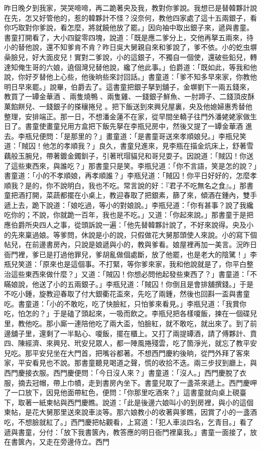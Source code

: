 昨日晚夕到我家，哭哭啼啼，再二跪著央及我，教對你爹說。我想已是替韓夥計說在先，怎又好管他的，惹的韓夥計不怪？沒奈何，教他四家處了這十五兩銀子，看你巧取對你爹說，看怎麼，將就饒他放了罷。」因向袖中取出銀子來，遞與書童。書童打開看了，大小四錠零四塊，說道：「既是應二爹分上，交他再拏五兩來，待小的替他說，還不知爹肯不肯？昨日吳大舅親自來和爹說了，爹不依。小的虼虫塀喿臉兒，好大面皮兒！實對二爹說，小的這銀子，不獨自一個使，還破些鉛兒，轉達知俺生哥的六娘，遶個灣兒替他說，纔了他此事。」伯爵道：「既如此，等我和他說，你好歹替他上心些，他後晌些來討回話。」書童道：「爹不知多早來家，你教他明日早來罷。」說畢，伯爵去了。這書童把銀子拏到舖子，金塀劉下一兩五錢來，教買了一罈金華酒 、兩隻燒鴨 、兩隻雞、一錢銀子鮮魚、一肘蹄子、二錢頂皮酥菓餡餅兒、一錢銀子的搽穰捲兒 。把下飯送到來興兒屋裏，央及他媳婦惠秀替他整理，安排端正。那一日，不想潘金蓮不在家，從早間坐轎子往門外潘姥姥家做生日了。書童使畫童兒用方盒把下飯先拏在李瓶兒房中，然後又提了一罈金華酒 進去。李瓶兒便問：「是那里的？」畫童道：「是書童哥送來孝順娘兒。」李瓶兒笑道：「賊囚！他怎的孝順我？」良久，書童兒進來，見李瓶在描金炕床上，舒著雪藕般玉腕兒，帶著鍍金鐲釧子，引著玳瑁貓兒和哥兒耍子。因說道：「賊囚！你送了這些東西來，與誰吃？」那書童只是笑。李瓶兒道：「你不言語，笑是怎的說？」書童道：「小的不孝順娘，再孝順誰？」李瓶兒道：「賊囚！你平日好好的，怎麼孝順我？是的，你不說明白，我也不吃。常言說的好：『君子不吃無名之食』。」那書童把酒打開，菜蔬都擺在小桌上，教迎春取了把銀素，篩了來，傾酒在鍾內，雙手遞上去，跪下說道：「娘吃過，等小的對娘說。」李瓶兒道：「你有甚事？說了我纔吃你的；不說，你就跪一百年，我也是不吃。」又道：「你起來說。」那書童于是把應伯爵所央四人之事，從頭訴說一遍：「他先替韓夥計說了，不好來說得。央及小的先來稟過娘。等爹問，休說是小的說，只假做花大舅那頭使人來說。小的寫下個帖兒，在前邊書房內，只說是娘遞與小的，教與爹看。娘屋裡再加一美言。況昨日衙門裡，爹已是打過他罪兒，爹胡亂做個處斷，放了他罷，也是老大的陰騭！」李瓶兒笑道：「原來也是這個事。不打緊，等你爹來家，我和他說就是了，你平白整治這些東西來做什麼？」又道：「賊囚！你想必問他起發些東西了？」書童道：「不瞞娘說，他送了小的五兩銀子。」李瓶兒道：「賊囚！你倒且是會排舖撰錢。」于是不吃小鍾，旋教迎春取了付大銀衢花盃來，先吃了兩鍾，然後也回斟一盃與書童吃。書童道：「小的不敢吃，吃了快臉紅，只怕爹來看見。」李瓶兒道：「我賞你吃，怕怎的？」于是磕了頭起來，一吸而飲之。李瓶兒把各樣嗄飯，揀在一個碟兒里，教他吃。那小廝一連陪他吃了兩大盃，怕臉紅，就不敢吃，就出來了。到了前邊舖子里，還剩了一半點心、嗄飯，擺在櫃上。又打了兩提罈酒，請了傅夥計、賁四、陳經濟、來興兒、玳安兒眾人，都一陣風捲殘雲，吃了箇淨光，就忘了教平安兒吃。那平安兒坐在大門首，把嘴谷都著。不想西門慶約後晌，從門外拜了客來家，平安看見也不說。那書童聽見喝道之聲，慌的收拾不迭。兩三步扠到廳上，與西門慶接衣服。西門慶便問：「今日沒人來？」書童道：「沒人。」西門慶脫了衣服，摘去冠帽，帶上巾幘，走到書房內坐下。書童兒取了一盞茶來遞上。西門慶呷了一口放下，因見他面帶紅色，便問：「你那里吃酒來？」這書童就向桌上硯臺下，取著一紙柬帖與西門慶瞧。說道：「此是後邊六娘叫小的到房裡，與小的這個柬帖，是花大舅那里送來說車淡等。那六娘教小的收著與爹瞧，因賞了小的一盞酒吃，不想臉就紅了。」西門慶把帖觀看，上寫道：「犯人車淡四名，乞青目。」看了遞與書童，分付：「放下我書篋內，教答應的明日衙門裡稟我。」書童一面接了，放在書篋內，又走在旁邊侍立。西門